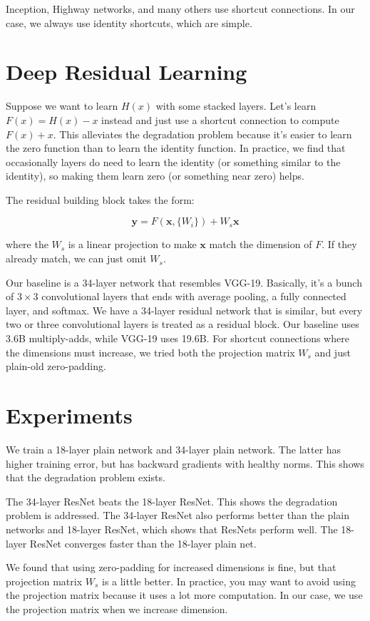 \documentclass[a4paper]{article}
\begin{document}
Inception, Highway networks, and many others use shortcut connections. In our
case, we always use identity shortcuts, which are simple.

\section{Deep Residual Learning}
Suppose we want to learn $H(x)$ with some stacked layers. Let's learn $F(x)
= H(x) - x$ instead and just use a shortcut connection to compute $F(x) + x$.
This alleviates the degradation problem because it's easier to learn the
zero function than to learn the identity function. In practice, we find that
occasionally layers do need to learn the identity (or something similar to
the identity), so making them learn zero (or something near zero) helps.

The residual building block takes the form:

$$
\mathbf{y} = F(\mathbf{x}, \{W_i\}) + W_s \mathbf{x}
$$

where the $W_s$ is a linear projection to make $\mathbf{x}$ match the dimension
of $F$. If they already match, we can just omit $W_s$.

Our baseline is a 34-layer network that resembles VGG-19. Basically, it's a
bunch of $3 \times 3$ convolutional layers that ends with average pooling,
a fully connected layer, and softmax. We have a 34-layer residual network that
is similar, but every two or three convolutional layers is treated as a 
residual block. Our baseline uses 3.6B multiply-adds, while VGG-19 uses 19.6B.
For shortcut connections where the dimensions must increase, we tried both the
projection matrix $W_s$ and just plain-old zero-padding.

\section{Experiments}
We train a 18-layer plain network and 34-layer plain network. The latter has
higher training error, but has backward gradients with healthy norms. This 
shows that the degradation problem exists.

The 34-layer ResNet beats the 18-layer ResNet. This shows the degradation
problem is addressed. The 34-layer ResNet also performs better than the plain
networks and 18-layer ResNet, which shows that ResNets perform well. The 
18-layer ResNet converges faster than the 18-layer plain net.

We found that using zero-padding for increased dimensions is fine, but that
projection matrix $W_s$ is a little better. In practice, you may want to avoid
using the projection matrix because it uses a lot more computation. In our
case, we use the projection matrix when we increase dimension.
\end{document}
